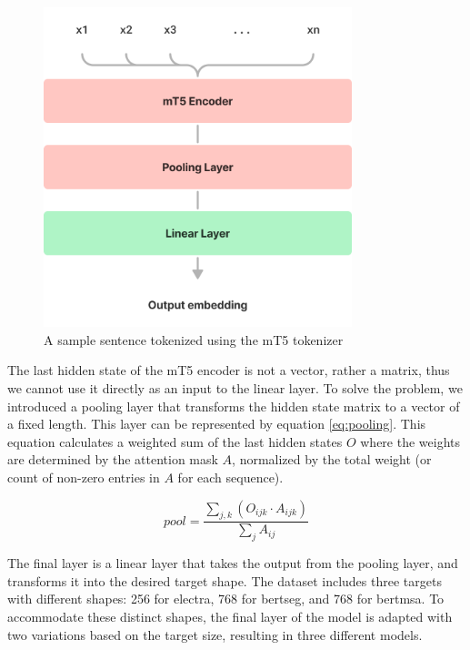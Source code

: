 \documentclass[12pt]{article}
\begin{document}
\begin{figure}
    \centering
    \captionsetup{justification=centering}
    \includegraphics[width=0.8\textwidth]{model-arch.png}
    \caption{A sample sentence tokenized using the mT5 tokenizer}
    \label{fig:model-arch}
\end{figure}

The last hidden state of the mT5 encoder is not a vector, rather a matrix, thus we cannot use it directly as an input to the linear layer. To solve the problem, we introduced a pooling layer that transforms the hidden state matrix to a vector of a fixed length. This layer can be represented by equation \ref{eq:pooling}. This equation calculates a weighted sum of the last hidden states \(O\) where the weights are determined by the attention mask \(A\), normalized by the total weight (or count of non-zero entries in \(A\) for each sequence).

\begin{equation} \label{eq:pooling}
    pool = \frac{\sum_{j,k} (O_{ijk} \cdot A_{ijk})}{\sum_j A_{ij}}
\end{equation}

The final layer is a linear layer that takes the output from the pooling layer, and transforms it into the desired target shape. The dataset includes three targets with different shapes: 256 for electra, 768 for bertseg, and 768 for bertmsa. To accommodate these distinct shapes, the final layer of the model is adapted with two variations based on the target size, resulting in three different models.
\end{document}
